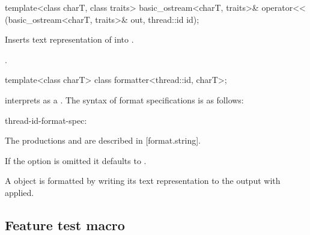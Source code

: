 \documentclass{wg21}
\begin{document}
%
\begin{itemdecl}
    template<class charT, class traits>
    basic_ostream<charT, traits>&
    operator<< (basic_ostream<charT, traits>& out, thread::id id);
\end{itemdecl}

\begin{itemdescr}
    \pnum
    \effects
    Inserts  text representation  of  into
    . 

    \pnum
    \returns
    .
\end{itemdescr}

\begin{addedblock}

\begin{itemdecl}
template<class charT> class formatter<thread::id, charT>;
\end{itemdecl}

\begin{itemdescr}
 interprets  as a . The syntax of format specifications is as follows:

\begin{bnf}
thread-id-format-spec:\br
{} 	
\end{bnf}

\begin{note}
    The productions  and  are described in [format.string].
\end{note}

If the  option is omitted it defaults to \tcode{>}.

A  object is formatted by writing its text representation  to the output with  applied.
\end{itemdescr}

\end{addedblock}

\subsection{Feature test macro}
\end{document}

